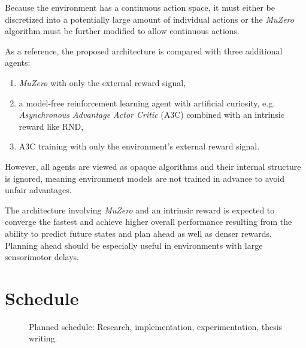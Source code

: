 \documentclass{article}
\begin{document}
Because the environment has a continuous action space, it must either be discretized into a potentially large amount of individual actions or the \textit{MuZero} algorithm must be further modified to allow continuous actions.

As a reference, the proposed architecture is compared with three additional agents:
\begin{enumerate}
    \item \textit{MuZero} with only the external reward signal,
    \item a model-free reinforcement learning agent with artificial curiosity, e.g. \textit{Asynchronous Advantage Actor Critic} (A3C) \cite{a3c} combined with an intrinsic reward like RND,
    \item A3C training with only the environment's external reward signal.
\end{enumerate}
However, all agents are viewed as opaque algorithms and their internal structure is ignored, meaning environment models are not trained in advance to avoid unfair advantages.

The architecture involving \textit{MuZero} and an intrinsic reward is expected to converge the fastest and achieve higher overall performance resulting from the ability to predict future states and plan ahead as well as denser rewards. Planning ahead should be especially useful in environments with large sensorimotor delays.

\section{Schedule}

\begin{figure}[h]
    \centering
    \caption{Planned schedule: Research, implementation, experimentation, thesis writing.}
    \label{fig:schedule}
\end{figure}
\end{document}
